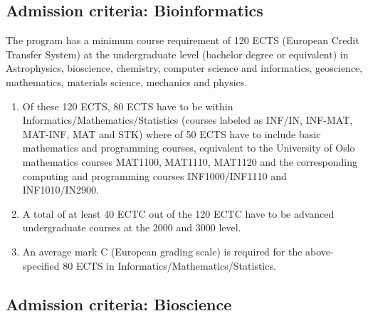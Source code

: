 \documentclass[%
oneside,                 %
final,                   %
10pt]{article}
\begin{document}
\noindent
\subsection{Admission criteria: Bioinformatics}

The program has a minimum course requirement of 120 ECTS (European Credit Transfer System) at the undergraduate level (bachelor degree or equivalent) in Astrophysics, bioscience, chemistry, computer science and informatics, geoscience, mathematics, materials science, mechanics and physics. 
\begin{enumerate}
\item Of these 120 ECTS, 80 ECTS have to be within Informatics/Mathematics/Statistics (courses labeled as INF/IN, INF-MAT, MAT-INF, MAT and STK) where of 50 ECTS have to include basic mathematics and programming courses, equivalent to the University of Oslo mathematics courses MAT1100, MAT1110, MAT1120 and the corresponding computing and programming courses INF1000/INF1110 and INF1010/IN2900. 

\item A total of at least 40 ECTC out of the 120 ECTC have to be advanced undergraduate courses at the 2000 and 3000 level.

\item An average mark C (European grading scale) is required for the above-specified 80 ECTS in Informatics/Mathematics/Statistics.
\end{enumerate}

\noindent
\subsection{Admission criteria: Bioscience}
\end{document}
